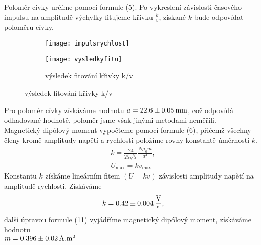 \documentclass[czech,11pt,a4paper]{article}
\begin{document}
	Poloměr cívky určíme pomocí formule (5). Po vykreslení závislosti časového impulsu na amplitudě výchylky fitujeme křivku $\frac{k}{v}$, získané $k$ bude odpovídat poloměru cívky. 
	
	 \begin{figure}[H]
		\begin{subfigure}{0.5\textwidth}
			\texttt{[image: impulsrychlost]} 
		\end{subfigure}
		\begin{subfigure}{0.5\textwidth}
				\texttt{[image: vysledkyfitu]}				
				\caption{výsledek fitování křivky k/v}
	\end{subfigure} \end{figure}
    Pro poloměr cívky získáváme hodnotu $ a = 22.6 \pm 0.05 \,\rm mm$, což odpovídá odhadované hodnotě, poloměr jsme však jinými metodami neměřili.\\
    Magnetický dipólový moment vypočteme pomocí formule (6), přičemž všechny členy kromě amplitudy napětí a rychlosti položíme rovny konstantě úměrnosti $k$. 
    \begin{gather}
    	k =\frac{24}{25 \sqrt{5}} \frac{N \mu_0 m}{a^2} ,\\
    	U_{\max }= k v_{\max }
    \end{gather}	
    Konstantu $k$ získáme lineárním fitem $(U=kv)$ závislosti amplitudy napětí na amplitudě rychlosti. Získáváme
    \begin{equation*}
    	k = 0.42 \pm 0.004 \,\rm \frac{V}{^\circ},
    \end{equation*}
    další úpravou formule (11) vyjádříme magnetický dipólový moment, získáváme hodnotu\\ $m = 0.396 \pm 0.02 \,\rm A.m^2$
    
\end{document}
